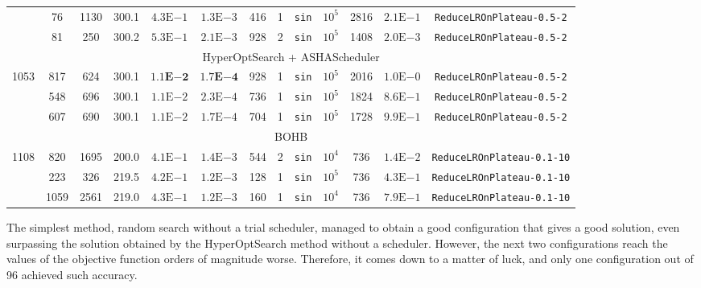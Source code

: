 \documentclass[reprint,
superscriptaddress,
amsmath,amssymb,aps,showkeys,showpacs,
twoside,final,secnumarabic,%
nofootinbib]{revtex4-2}
\begin{document}
\begin{table}
\begin{tabular}{|*{13}{c|}}
& 76 & 1130 & 300.1 & $4.3\mathrm{E}{-1}$ & $1.3\mathrm{E}{-3}$ & 416 & 1 & \texttt{sin} & $10^5$ & 2816 & $2.1\mathrm{E}{-1}$ & \texttt{ReduceLROnPlateau-0.5-2} \\ \cline{2-13}

& 81 & 250 & 300.2 & $5.3\mathrm{E}{-1}$ & $2.1\mathrm{E}{-3}$ & 928 & 2 & \texttt{sin} & $10^5$ & 1408 & $2.0\mathrm{E}{-3}$ & \texttt{ReduceLROnPlateau-0.5-2} \\ \hline

\multicolumn{13}{|c|}{HyperOptSearch + ASHAScheduler} \\ \hline

\multirow{3}{*}{1053} & 817 & 624 & 300.1 & $\mathbf{1.1E{-2}}$ & $\mathbf{1.7E{-4}}$ & 928 & 1 & \texttt{sin} & $10^5$ & 2016 & $1.0\mathrm{E}{-0}$ & \texttt{ReduceLROnPlateau-0.5-2} \\ \cline{2-13}

& 548 & 696 & 300.1 & $1.1\mathrm{E}{-2}$ & $2.3\mathrm{E}{-4}$ & 736 & 1 & \texttt{sin} & $10^5$ & 1824 & $8.6\mathrm{E}{-1}$ & \texttt{ReduceLROnPlateau-0.5-2} \\ \cline{2-13}

& 607 & 690 & 300.1 & $1.1\mathrm{E}{-2}$ & $1.7\mathrm{E}{-4}$ & 704 & 1 & \texttt{sin} & $10^5$ & 1728 & $9.9\mathrm{E}{-1}$ & \texttt{ReduceLROnPlateau-0.5-2} \\ \hline

\multicolumn{13}{|c|}{BOHB} \\ \hline

\multirow{3}{*}{1108} & 820 & 1695 & 200.0 & $4.1\mathrm{E}{-1}$ & $1.4\mathrm{E}{-3}$ & 544 & 2 & \texttt{sin} & $10^4$ & 736 & $1.4\mathrm{E}{-2}$ & \texttt{ReduceLROnPlateau-0.1-10} \\ \cline{2-13}

& 223 & 326 & 219.5 & $4.2\mathrm{E}{-1}$ & $1.2\mathrm{E}{-3}$ & 128 & 1 & \texttt{sin} & $10^5$ & 736 & $4.3\mathrm{E}{-1}$ & \texttt{ReduceLROnPlateau-0.1-10} \\ \cline{2-13}

& 1059 & 2561 & 219.0 & $4.3\mathrm{E}{-1}$ & $1.2\mathrm{E}{-3}$ & 160 & 1 & \texttt{sin} & $10^4$ & 736 & $7.9\mathrm{E}{-1}$ & \texttt{ReduceLROnPlateau-0.1-10} \\ \hline
\end{tabular}
\end{table}

The simplest method, random search without a trial scheduler, managed to obtain a good configuration that gives a good solution, even surpassing the solution obtained by the HyperOptSearch method without a scheduler. However, the next two configurations reach the values of the objective function orders of magnitude worse. Therefore, it comes down to a matter of luck, and only one configuration out of 96 achieved such accuracy.
\end{document}

